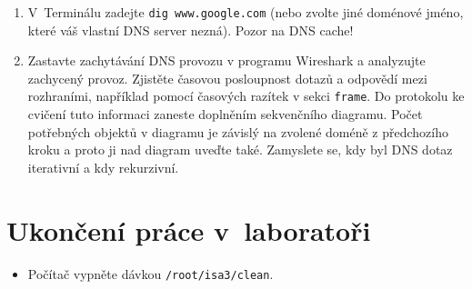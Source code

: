 \begin{enumerate}
  \item V~Terminálu zadejte {\tt dig www.google.com} (nebo zvolte jiné doménové jméno, které váš vlastní DNS server nezná). Pozor na DNS cache!
  
  \item Zastavte zachytávání DNS provozu v programu Wireshark a analyzujte zachycený provoz. Zjistěte časovou posloupnost dotazů a odpovědí mezi rozhraními, například pomocí časových razítek v sekci \texttt{frame}. Do protokolu ke cvičení tuto informaci zaneste doplněním sekvenčního diagramu. Počet potřebných objektů v diagramu je závislý na zvolené doméně z předchozího kroku a proto ji nad diagram uveďte také. Zamyslete se, kdy byl DNS dotaz iterativní a kdy rekurzivní. 
\end{enumerate}

\section{Ukončení práce v~laboratoři}
\begin{itemize}
  \item Počítač vypněte dávkou {\tt /root/isa3/clean}.
\end{itemize}

